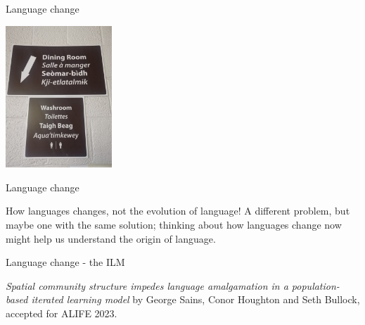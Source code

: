 \documentclass{beamer}
\begin{document}
\begin{frame}{Language change}
  \begin{minipage}[t][.7\textheight]{\textwidth}
    \vskip 1cm
    \begin{center}
      \includegraphics[width=0.3\textwidth]{signs.jpeg}
    \end{center}
\end{minipage}
\vfill
\color{gray}
\color{black}
\end{frame}


\begin{frame}{Language change}
  \begin{minipage}[t][.7\textheight]{\textwidth}
    \vskip 1cm
How languages changes, not the evolution of language! A different problem, but maybe one with the same solution; thinking about how languages change now might help us understand the origin of language.
\end{minipage}
\end{frame}


\begin{frame}{Language change - the ILM}
  \begin{minipage}[t][.7\textheight]{\textwidth}
    \vskip 1cm
\textsl{Spatial community structure impedes language amalgamation in a population-based iterated learning model} by George Sains, Conor Houghton and Seth Bullock, accepted for ALIFE 2023.
\end{minipage}
\end{frame}
\end{document}
